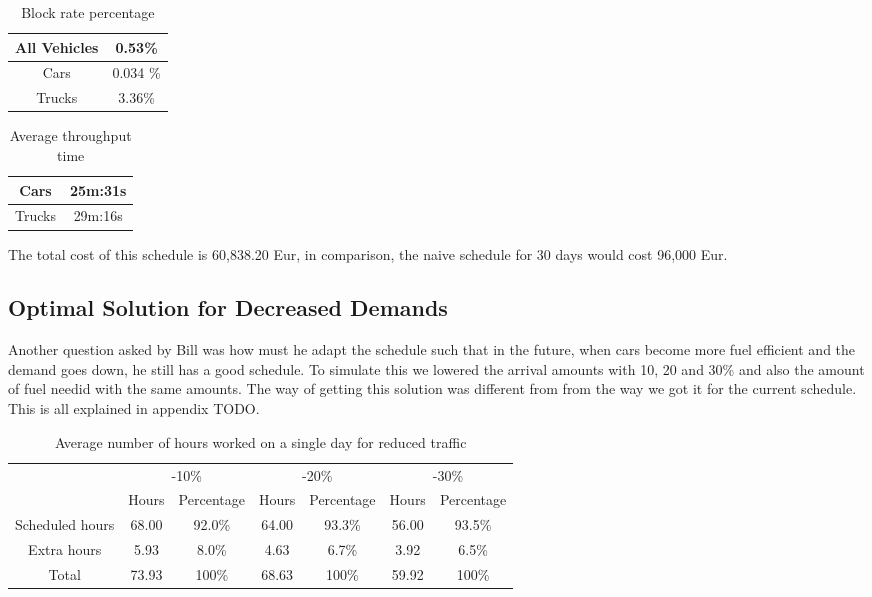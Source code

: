 \begin{table}
	\centering
	\begin{tabular}{|c|c|}
		\hline
		All Vehicles & 0.53\% \\ \hline
		Cars & 0.034 \% \\ \hline
		Trucks & 3.36\% \\ \hline
	\end{tabular}
	\caption{Block rate percentage}
	\label{tab:block}
\end{table}

\begin{table}
	\centering
	\begin{tabular}{|c|c|}
		\hline
		Cars & 25m:31s \\ \hline
		Trucks & 29m:16s \\ \hline
	\end{tabular}
	\caption{Average throughput time}
	\label{tab:throughput}
\end{table}

The total cost of this schedule is 60,838.20 Eur, in comparison, the naive schedule for 30 days would cost 96,000 Eur.


\subsection{Optimal Solution for Decreased Demands}
Another question asked by Bill was how must he adapt the schedule such that in the future, when cars become more fuel efficient and the demand goes down, he still has a good schedule. 
To simulate this we lowered the arrival amounts with 10, 20 and 30\% and  also the amount of fuel needid with the same amounts. 
The way of getting this solution was different from from the way we got it for the current schedule.
This is all explained in appendix TODO.

\begin{table}
	\centering
	\begin{tabular}{c|c|c|c|c|c|c|}
		\cline{2-7}
		& \multicolumn{2}{c|}{-10\%} & \multicolumn{2}{c|}{-20\%} & \multicolumn{2}{c|}{-30\%} \\ \cline{2-7} 
		& Hours     & Percentage     & Hours     & Percentage     & Hours     & Percentage     \\ \hline
		\multicolumn{1}{|c|}{Scheduled hours} & 68.00     & 92.0\%         & 64.00     & 93.3\%         & 56.00     & 93.5\%         \\ \hline
		\multicolumn{1}{|c|}{Extra hours}     & 5.93      & 8.0\%          & 4.63      & 6.7\%          & 3.92      & 6.5\%          \\ \hline
		\multicolumn{1}{|c|}{Total}           & 73.93     & 100\%          & 68.63     & 100\%          & 59.92     & 100\%          \\ \hline
	\end{tabular}
	\caption{Average number of hours worked on a single day for reduced traffic}
	\label{tab:hours}
\end{table}


